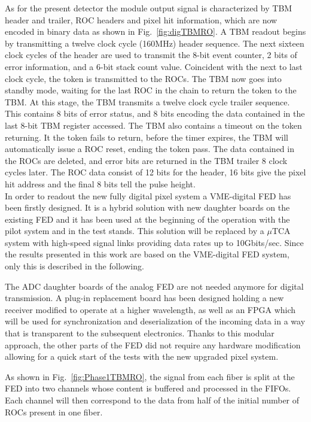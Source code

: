 As for the present detector the module output signal is characterized by TBM header and trailer, ROC headers and pixel hit information, which are now encoded in binary data as shown in Fig.~\ref{fig:digTBMRO}.
A TBM readout begins by transmitting a twelve clock cycle (160\unit{MHz}) header sequence.
The next sixteen clock cycles of the header are used to transmit the 8-bit event counter, 2 bits of error information, and a 6-bit stack count value.
Coincident with the next to last clock cycle, the token is transmitted to the ROCs. The TBM now goes into standby mode, waiting for the last ROC in the chain to return the token to the TBM.
At this stage, the TBM transmits a twelve clock cycle trailer sequence. This contains 8 bits of error status, and 8 bits encoding the data contained in the last 8-bit TBM register accessed.
The TBM also contains a timeout on the token returning. It the token fails to return, before the timer expires, the TBM will automatically issue a ROC reset, ending the token pass.
The data contained in the ROCs are deleted, and error bits are returned in the TBM trailer 8 clock cycles later.
The ROC data consist of 12 bits for the header, 16 bits give the pixel hit address and the final 8 bits tell the pulse height.\\

In order to readout the new fully digital pixel system a VME-digital FED has been firstly designed.
It is a hybrid solution with new daughter boards on the existing FED and it has been used at the beginning of the operation with the pilot system and in the test stands.
This solution will be replaced by a $\mu$TCA system with high-speed signal links providing data rates up to 10\unit{Gbits/sec}. 
Since the results presented in this work are based on the VME-digital FED system, only this is described in the following.

The ADC daughter boards of the analog FED are not needed anymore for digital transmission. A plug-in replacement board has been designed holding a new receiver modified to operate at a higher wavelength,
as well as an FPGA which will be used for synchronization and deserialization of the incoming data in a way that is transparent to the subsequent electronics.
Thanks to this modular approach, the other parts of the FED did not require any hardware modification allowing for a quick start of the tests with the new upgraded pixel system.

As shown in Fig.~\ref{fig:Phase1TBMRO}, the signal from each fiber is split at the FED into two channels whose content is buffered and processed in the FIFOs.
Each channel will then correspond to the data from half of the initial number of ROCs present in one fiber.

